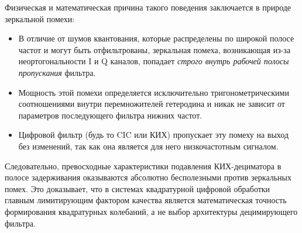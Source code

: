 Физическая и математическая причина такого поведения заключается в природе зеркальной помехи:
\begin{itemize}
    \item В отличие от шумов квантования, которые распределены по широкой полосе частот и могут быть отфильтрованы, зеркальная помеха, возникающая из-за неортогональности I и Q каналов, попадает \textit{строго внутрь рабочей полосы пропускания} фильтра.
    \item Мощность этой помехи определяется исключительно тригонометрическими соотношениями внутри перемножителей гетеродина и никак не зависит от параметров последующего фильтра нижних частот.
    \item Цифровой фильтр (будь то CIC или КИХ) пропускает эту помеху на выход без изменений, так как она является для него низкочастотным сигналом.
\end{itemize}

Следовательно, превосходные характеристики подавления КИХ-дециматора в полосе задерживания оказываются абсолютно бесполезными против зеркальных помех. Это доказывает, что в системах квадратурной цифровой обработки главным лимитирующим фактором качества является математическая точность формирования квадратурных колебаний, а не выбор архитектуры децимирующего фильтра.